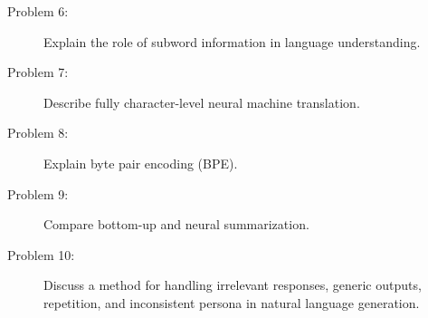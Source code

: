 \documentclass[10pt]{article}
\begin{document}
\begin{description}
\pagebreak

\item[Problem 6:]  Explain the role of subword information in language understanding.

\pagebreak

\item[Problem 7:]  Describe fully character-level neural machine translation.

\pagebreak

\item[Problem 8:]  Explain byte pair encoding (BPE).

\pagebreak

\item[Problem 9:]  Compare bottom-up and neural summarization.

\pagebreak


\item[Problem 10:]  Discuss a method for handling irrelevant responses, generic outputs, repetition, and inconsistent persona in natural language generation.


\end{description}
\end{document}
